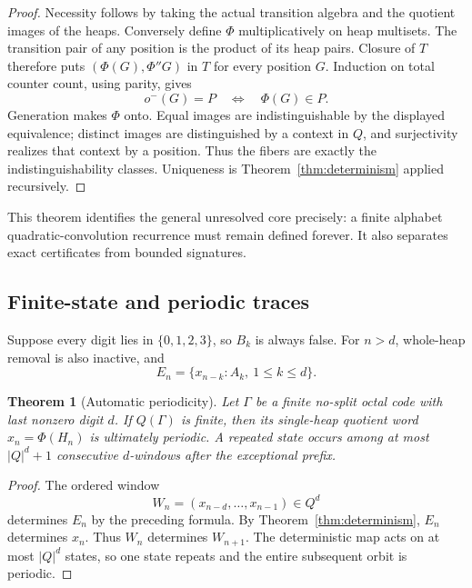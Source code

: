 \documentclass[11pt]{article}
\newtheorem{theorem}{Theorem}[section]
\theoremstyle{definition}
\theoremstyle{remark}
\begin{document}
\begin{proof}
Necessity follows by taking the actual transition algebra and the quotient
images of the heaps.  Conversely define $\Phi$ multiplicatively on heap
multisets.  The transition pair of any position is the product of its heap
pairs.  Closure of $T$ therefore puts
$(\Phi(G),\Phi''G)$ in $T$ for every position $G$.  Induction on total
counter count, using parity, gives
\[
 o^-(G)=P\quad\Longleftrightarrow\quad\Phi(G)\in P.
\]
Generation makes $\Phi$ onto.  Equal images are indistinguishable by the
displayed equivalence; distinct images are distinguished by a context in
$Q$, and surjectivity realizes that context by a position.  Thus the fibers
are exactly the indistinguishability classes.  Uniqueness is
Theorem~\ref{thm:determinism} applied recursively.
\end{proof}

This theorem identifies the general unresolved core precisely: a finite
alphabet quadratic-convolution recurrence must remain defined forever.  It
also separates exact certificates from bounded signatures.

\subsection{Finite-state and periodic traces}

Suppose every digit lies in $\{0,1,2,3\}$, so $B_k$ is always false.  For
$n>d$, whole-heap removal is also inactive, and
\begin{equation}
 E_n=\{x_{n-k}:A_k,\ 1\le k\le d\}.
\end{equation}

\begin{theorem}[Automatic periodicity]\label{thm:periodicity}
Let $\Gamma$ be a finite no-split octal code with last nonzero digit $d$.
If $Q(\Gamma)$ is finite, then its single-heap quotient word
$x_n=\Phi(H_n)$ is ultimately periodic.  A repeated state occurs among at
most $|Q|^d+1$ consecutive $d$-windows after the exceptional prefix.
\end{theorem}

\begin{proof}
The ordered window
\[
 W_n=(x_{n-d},\ldots,x_{n-1})\in Q^d
\]
determines $E_n$ by the preceding formula.  By
Theorem~\ref{thm:determinism}, $E_n$ determines $x_n$.  Thus $W_n$
determines $W_{n+1}$.  The deterministic map acts on at most $|Q|^d$
states, so one state repeats and the entire subsequent orbit is periodic.
\end{proof}
\end{document}
